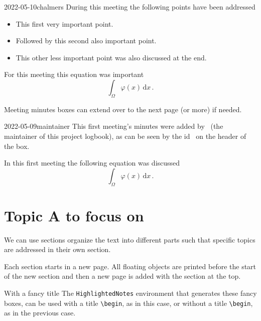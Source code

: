 \documentclass{project-logbook}
\begin{document}
{\begin{MeetingMinutes}{2022-05-10}{chalmers}
		During this meeting the following points have been addressed
		\begin{itemize}
			\item This first very important point.
			\item Followed by this second also important point.
			\item This other less important point was also discussed at the end.
		\end{itemize}
		
		For this meeting this equation was important
		\begin{equation}
			\int_{\Omega}{\varphi(x)}\,\mathrm{d}x\,.
		\end{equation}
		\lipsum[2]
		
		\begin{tip}
			Meeting minutes boxes can extend over to the next page (or more) if needed.
		\end{tip}
	\end{MeetingMinutes}
	
	
	\begin{MeetingMinutes}{2022-05-09}{maintainer}
		This first meeting's minutes were added by \MaintainerName~(the maintainer of this project logbook), as can be seen by the id \emph{\Maintainerid}~on the header of the box.
		
		In this first meeting the following equation was discussed
		\begin{equation}
			\int_{\Omega}{\varphi(x)}\,\mathrm{d}x\,.
		\end{equation}
		\lipsum[1]
	\end{MeetingMinutes}

	

\section{Topic A to focus on} \label{sec:topic_A}
	We can use sections organize the text into different parts  such that specific topics are addressed in their own section.
	
	\begin{HighlightedNote}{}
		Each section starts in a new page. All floating objects are printed before the start of the new section and then a new page is added with the section at the top.
	\end{HighlightedNote}
	
	\begin{HighlightedNote}{With a fancy title}
		The \texttt{HighlightedNotes} environment that generates these fancy boxes, can be used with a title \texttt{\textbackslash begin}, as in this case, or without a title \texttt{\textbackslash begin\string{\string}}, as in the previous case.
	\end{HighlightedNote}
	
}
\end{document}
